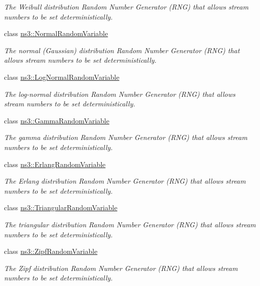 \begin{DoxyCompactItemize}
\begin{DoxyCompactList}\small\item\em The Weibull distribution Random Number Generator (R\+NG) that allows stream numbers to be set deterministically. \end{DoxyCompactList}\item 
class \hyperlink{classns3_1_1NormalRandomVariable}{ns3\+::\+Normal\+Random\+Variable}
\begin{DoxyCompactList}\small\item\em The normal (Gaussian) distribution Random Number Generator (R\+NG) that allows stream numbers to be set deterministically. \end{DoxyCompactList}\item 
class \hyperlink{classns3_1_1LogNormalRandomVariable}{ns3\+::\+Log\+Normal\+Random\+Variable}
\begin{DoxyCompactList}\small\item\em The log-\/normal distribution Random Number Generator (R\+NG) that allows stream numbers to be set deterministically. \end{DoxyCompactList}\item 
class \hyperlink{classns3_1_1GammaRandomVariable}{ns3\+::\+Gamma\+Random\+Variable}
\begin{DoxyCompactList}\small\item\em The gamma distribution Random Number Generator (R\+NG) that allows stream numbers to be set deterministically. \end{DoxyCompactList}\item 
class \hyperlink{classns3_1_1ErlangRandomVariable}{ns3\+::\+Erlang\+Random\+Variable}
\begin{DoxyCompactList}\small\item\em The Erlang distribution Random Number Generator (R\+NG) that allows stream numbers to be set deterministically. \end{DoxyCompactList}\item 
class \hyperlink{classns3_1_1TriangularRandomVariable}{ns3\+::\+Triangular\+Random\+Variable}
\begin{DoxyCompactList}\small\item\em The triangular distribution Random Number Generator (R\+NG) that allows stream numbers to be set deterministically. \end{DoxyCompactList}\item 
class \hyperlink{classns3_1_1ZipfRandomVariable}{ns3\+::\+Zipf\+Random\+Variable}
\begin{DoxyCompactList}\small\item\em The Zipf distribution Random Number Generator (R\+NG) that allows stream numbers to be set deterministically. \end{DoxyCompactList}\item 

\end{DoxyCompactItemize}
